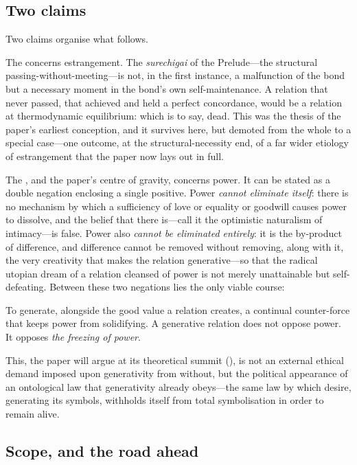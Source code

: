\subsection{Two claims}
\label{p17:sub:intro-claims}

Two claims organise what follows.

The  concerns estrangement. The \emph{surechigai} of the Prelude---the structural passing-without-meeting---is not, in the first instance, a malfunction of the bond but a necessary moment in the bond's own self-maintenance. A relation that never passed, that achieved and held a perfect concordance, would be a relation at thermodynamic equilibrium: which is to say, dead. This was the thesis of the paper's earliest conception, and it survives here, but demoted from the whole to a special case---one outcome, at the structural-necessity end, of a far wider etiology of estrangement that the paper now lays out in full.

The , and the paper's centre of gravity, concerns power. It can be stated as a double negation enclosing a single positive. Power \emph{cannot eliminate itself}: there is no mechanism by which a sufficiency of love or equality or goodwill causes power to dissolve, and the belief that there is---call it the optimistic naturalism of intimacy---is false. Power also \emph{cannot be eliminated entirely}: it is the by-product of difference, and difference cannot be removed without removing, along with it, the very creativity that makes the relation generative---so that the radical utopian dream of a relation cleansed of power is not merely unattainable but self-defeating. Between these two negations lies the only viable course:

\begin{claim}
To generate, alongside the good value a relation creates, a continual counter-force that keeps power from solidifying. A generative relation does not oppose power. It opposes \emph{the freezing of power}.
\end{claim}

\noindent This, the paper will argue at its theoretical summit (), is not an external ethical demand imposed upon generativity from without, but the political appearance of an ontological law that generativity already obeys---the same law by which desire, generating its symbols, withholds itself from total symbolisation in order to remain alive.

\subsection{Scope, and the road ahead}
\label{p17:sub:intro-scope}

